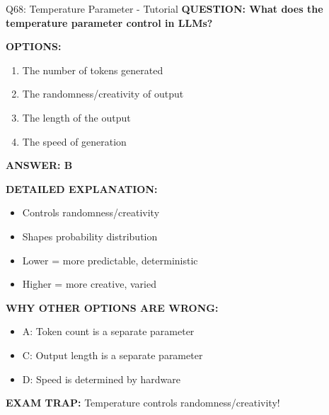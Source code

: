 \documentclass[8pt]{beamer}
\begin{document}
	\begin{frame}{Q68: Temperature Parameter - Tutorial}
		\fontsize{6.5}{7.5}\selectfont
		\textbf{QUESTION: What does the temperature parameter control in LLMs?}
		
		\vspace{0.1cm}
		\textbf{OPTIONS:}
		\begin{enumerate}
			\item The number of tokens generated
			\item The randomness/creativity of output
			\item The length of the output
			\item The speed of generation
		\end{enumerate}
		
		\vspace{0.1cm}
		\textcolor{myblue}{\textbf{ANSWER: B}}
		
		\vspace{0.1cm}
		\textbf{DETAILED EXPLANATION:}
		\begin{itemize}
			\item Controls randomness/creativity
			\item Shapes probability distribution
			\item Lower = more predictable, deterministic
			\item Higher = more creative, varied
		\end{itemize}
		
		\vspace{0.1cm}
		\textcolor{myred}{\textbf{WHY OTHER OPTIONS ARE WRONG:}}
		\begin{itemize}
			\item \textcolor{myred}{A:} Token count is a separate parameter
			\item \textcolor{myred}{C:} Output length is a separate parameter
			\item \textcolor{myred}{D:} Speed is determined by hardware
		\end{itemize}
		
		\textcolor{myred}{\textbf{EXAM TRAP:}} Temperature controls \textcolor{myblue}{randomness/creativity}!
	\end{frame}
	
\end{document}
